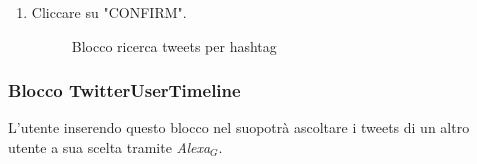 \begin{enumerate}
	\item Cliccare su "CONFIRM".
	\begin{figure}[!ht]
		\centering
		\caption{Blocco ricerca tweets per hashtag}
	\end{figure}
\end{enumerate}

\subsubsection{Blocco TwitterUserTimeline} \label{twitterU}
L'utente inserendo questo blocco nel suopotrà ascoltare i tweets di un altro utente a sua scelta tramite \textit{Alexa$_{G}$}.

